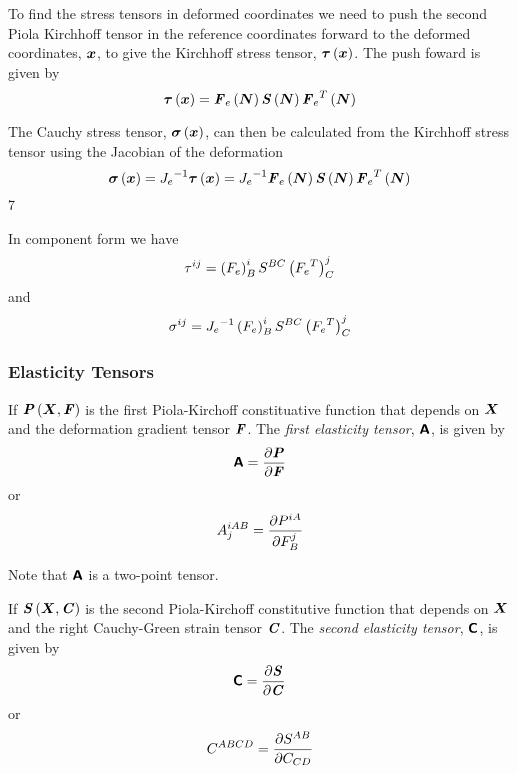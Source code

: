 To find the stress tensors in deformed coordinates we need to push the second
Piola Kirchhoff tensor in the reference coordinates forward to the deformed
coordinates, $\boldsymbol{x}$, to give the Kirchhoff stress tensor,
$ \boldsymbol{\mathit{\tau}}\left( \boldsymbol{x} \right) $. The push foward is given by
\begin{equation}
   \boldsymbol{\mathit{\tau}}\left( \boldsymbol{x} \right) = \boldsymbol{\mathit{F}}_{e}\left( \boldsymbol{N} \right)  \boldsymbol{\mathit{S}}\left( \boldsymbol{N} \right) 
   {\boldsymbol{\mathit{F}}_{e}}^{T}\left( \boldsymbol{N} \right) 
\end{equation}

The Cauchy stress tensor, $ \boldsymbol{\mathit{\sigma}}\left( \boldsymbol{x} \right) $, can then be calculated from the Kirchhoff stress
tensor using the Jacobian of the deformation \ie
\begin{equation}
   \boldsymbol{\mathit{\sigma}}\left( \boldsymbol{x} \right) ={J_{e}}^{-1} \boldsymbol{\mathit{\tau}}\left( \boldsymbol{x} \right) ={J_{e}}^{-1}
   \boldsymbol{\mathit{F}}_{e}\left( \boldsymbol{N} \right)  \boldsymbol{\mathit{S}}\left( \boldsymbol{N} \right)  {\boldsymbol{\mathit{F}}_{e}}^{T}\left( \boldsymbol{N} \right) 
\end{equation}7

In component form we have
\begin{equation}
  \tau^{ij}=\left( F_{e} \right)^{i}_{B}S^{BC}\left( {F_{e}}^{T} \right)^{j}_{C}
\end{equation}
and
\begin{equation}
  \sigma^{ij}={J_{e}}^{-1}\left( F_{e} \right)^{i}_{B}S^{BC}\left( {F_{e}}^{T} \right)^{j}_{C}
\end{equation}


\subsubsection{Elasticity Tensors}

If $ \boldsymbol{\mathit{P}}\left( \boldsymbol{X},\boldsymbol{\mathit{F}} \right) $ is the first Piola-Kirchoff
constituative function that depends on $\boldsymbol{X}$ and the deformation
gradient tensor $\boldsymbol{\mathit{F}}$. The \emph{first elasticity tensor},
$\boldsymbol{\mathsf{A}}$, is given by 
\begin{equation}
  \boldsymbol{\mathsf{A}}= \dfrac{\partial \boldsymbol{\mathit{P}}}{\partial \boldsymbol{\mathit{F}}} 
\end{equation}
or
\begin{equation}
  A^{iAB}_{j}= \dfrac{\partial P^{iA}}{\partial F^{j}_{B}} 
\end{equation}

Note that $\boldsymbol{\mathsf{A}}$ is a two-point tensor. 

If $ \boldsymbol{\mathit{S}}\left( \boldsymbol{X},\boldsymbol{\mathit{C}} \right) $ is the second Piola-Kirchoff
constitutive function that depends on $\boldsymbol{X}$ and the right Cauchy-Green
strain tensor $\boldsymbol{\mathit{C}}$. The \emph{second elasticity tensor},
$\boldsymbol{\mathsf{C}}$, is given by 
\begin{equation}
  \boldsymbol{\mathsf{C}}= \dfrac{\partial \boldsymbol{\mathit{S}}}{\partial \boldsymbol{\mathit{C}}} 
\end{equation}
or
\begin{equation}
  C^{ABCD}= \dfrac{\partial S^{AB}}{\partial C_{CD}} 
\end{equation}

